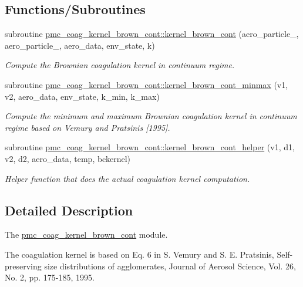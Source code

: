 \subsection*{Functions/\+Subroutines}
\begin{DoxyCompactItemize}
\item 
subroutine \mbox{\hyperlink{namespacepmc__coag__kernel__brown__cont_abcd2f47ef31e60a8f1446fef30a69306}{pmc\+\_\+coag\+\_\+kernel\+\_\+brown\+\_\+cont\+::kernel\+\_\+brown\+\_\+cont}} (aero\+\_\+particle\+\_, aero\+\_\+particle\+\_, aero\+\_\+data, env\+\_\+state, k)
\begin{DoxyCompactList}\small\item\em Compute the Brownian coagulation kernel in continuum regime. \end{DoxyCompactList}\item 
subroutine \mbox{\hyperlink{namespacepmc__coag__kernel__brown__cont_a4e0c382e477955188e558f4feeefce74}{pmc\+\_\+coag\+\_\+kernel\+\_\+brown\+\_\+cont\+::kernel\+\_\+brown\+\_\+cont\+\_\+minmax}} (v1, v2, aero\+\_\+data, env\+\_\+state, k\+\_\+min, k\+\_\+max)
\begin{DoxyCompactList}\small\item\em Compute the minimum and maximum Brownian coagulation kernel in continuum regime based on Vemury and Pratsinis \mbox{[}1995\mbox{]}. \end{DoxyCompactList}\item 
subroutine \mbox{\hyperlink{namespacepmc__coag__kernel__brown__cont_a7e5d5ce90516da22eb41dfbf20cf8efe}{pmc\+\_\+coag\+\_\+kernel\+\_\+brown\+\_\+cont\+::kernel\+\_\+brown\+\_\+cont\+\_\+helper}} (v1, d1, v2, d2, aero\+\_\+data, temp, bckernel)
\begin{DoxyCompactList}\small\item\em Helper function that does the actual coagulation kernel computation. \end{DoxyCompactList}\end{DoxyCompactItemize}


\subsection{Detailed Description}
The \mbox{\hyperlink{namespacepmc__coag__kernel__brown__cont}{pmc\+\_\+coag\+\_\+kernel\+\_\+brown\+\_\+cont}} module. 

The coagulation kernel is based on Eq. 6 in S. Vemury and S. E. Pratsinis, Self-\/preserving size distributions of agglomerates, Journal of Aerosol Science, Vol. 26, No. 2, pp. 175-\/185, 1995. 